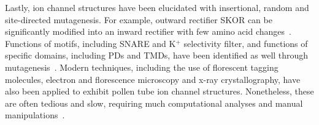 \documentclass[11pt]{article}
\begin{document}
\begin{multicols*}{2}
\newline\newline
Lastly, ion channel structures have been elucidated with insertional, random and site-directed mutagenesis. For example, outward rectifier SKOR can be significantly modified into an inward rectifier with few amino acid changes~\citep{Li2008}. Functions of motifs, including SNARE and K$^{+}$ selectivity filter, and functions of specific domains, including PDs and TMDs, have been identified as well through mutagenesis~\citep{Gajdanowicz2009,Gobert2007,Grefen2010,Very2003}. Modern techniques, including the use of florescent tagging molecules, electron and florescence microscopy and x-ray crystallography, have also been applied to exhibit pollen tube ion channel structures. Nonetheless, these are often tedious and slow, requiring much computational analyses and manual manipulations~\citep{Doyle1998,Ondrus2012,Schutz2000}.  


\end{multicols*}
\end{document}
